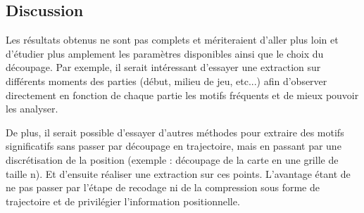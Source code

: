 \subsection{Discussion} %

Les résultats obtenus ne sont pas complets et mériteraient d'aller plus loin et d'étudier plus amplement les paramètres disponibles ainsi que le choix du découpage. Par exemple, il serait intéressant d'essayer une extraction sur différents moments des parties (début, milieu de jeu, etc...) afin d'observer directement en fonction de chaque partie les motifs fréquents et de mieux pouvoir les analyser.

De plus, il serait possible d'essayer d'autres méthodes pour extraire des motifs significatifs sans passer par découpage en trajectoire, mais en passant par une discrétisation de la position (exemple : découpage de la carte en une grille de taille n). Et d'ensuite réaliser une extraction sur ces points. L'avantage étant de ne pas passer par l'étape de recodage ni de la compression sous forme de trajectoire et de privilégier l'information positionnelle.